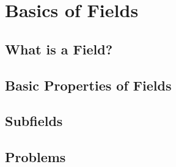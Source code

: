 \chapter{Basics of Fields}

\section{What is a Field?}

\section{Basic Properties of Fields}

\section{Subfields}

\newpage

\section{Problems}
